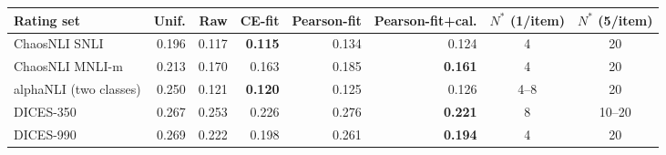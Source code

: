 \begin{tabular}{lrrrrrcc}
\toprule
Rating set & Unif. & Raw & CE-fit & Pearson-fit & Pearson-fit+cal. & $N^\ast$ (1/item) & $N^\ast$ (5/item) \\
\midrule
ChaosNLI SNLI & 0.196 & 0.117 & \textbf{0.115} & 0.134 & 0.124 & 4 & 20 \\
ChaosNLI MNLI-m & 0.213 & 0.170 & 0.163 & 0.185 & \textbf{0.161} & 4 & 20 \\
alphaNLI (two classes) & 0.250 & 0.121 & \textbf{0.120} & 0.125 & 0.126 & 4--8 & 20 \\
DICES-350 & 0.267 & 0.253 & 0.226 & 0.276 & \textbf{0.221} & 8 & 10--20 \\
DICES-990 & 0.269 & 0.222 & 0.198 & 0.261 & \textbf{0.194} & 4 & 20 \\
\bottomrule
\end{tabular}
